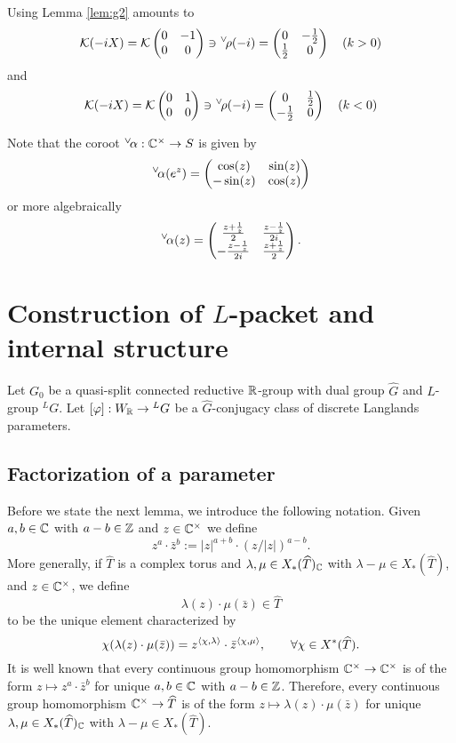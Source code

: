 \documentclass{article}
\theoremstyle{definition}
\numberwithin{equation}{section}
\renewcommand{\-}{\hyp{}}
\newcommand{\K}{\mathcal K}
\newcommand{\ch}[1]{\negthinspace\negthinspace\negthinspace\phantom{a}^\vee\negthinspace #1}
\begin{document}
Using Lemma \ref{lem:g2} amounts to 
$$
\K(-iX)=\K\begin{pmatrix}0&-1\\0&0
\end{pmatrix}\ni \ch\rho(-i)=
\begin{pmatrix}
  0&-\frac 12\\\frac 12&0
\end{pmatrix}\quad (k>0)
$$
and
$$
\K(-iX)=\K\begin{pmatrix}0&1\\0&0
\end{pmatrix}\ni \ch\rho(-i)=
\begin{pmatrix}
  0&\frac 12\\-\frac 12&0
\end{pmatrix}\quad (k<0)
$$

Note that the coroot $\ch\alpha:\C^\times \rightarrow S$ is given by
$$
\ch\alpha(e^z)=\begin{pmatrix}\cos(z)&\sin(z)\\-\sin(z)&\cos(z)
\end{pmatrix}
$$
or more algebraically
$$
\ch\alpha(z)=\begin{pmatrix}
\frac{z+\frac 1z}2&\frac{z-\frac 1z}{2i}\\
-\frac{z-\frac 1z}{2i}&\frac{z+\frac 1z}2
\end{pmatrix}.
$$


\section{Construction of $L$\-packet and internal structure} \label{sec:cons}

Let $G_0$ be a quasi-split connected reductive $\mathbb{R}$-group with dual group $\hat G$ and $L$\-group $^LG$.
Let $[\varphi] : W_{\mathbb{R}} \to {^LG}$ be a $\hat G$-conjugacy class of discrete Langlands parameters.

\subsection{Factorization of a parameter} \label{sub:fac}

Before we state the next lemma, we introduce the following notation. Given $a,b \in \mathbb{C}$ with $a-b \in \mathbb{Z}$ and $z \in \mathbb{C}^\times$ we define
\[ z^a \cdot \bar z^b := |z|^{a+b} \cdot (z/|z|)^{a-b}. \]
More generally, if $\hat T$ is a complex torus and $\lambda,\mu \in X_*(\widehat T)_{\mathbb{C}}$ with $\lambda-\mu \in X_*(\hat T)$, and $z \in \mathbb{C}^\times$, we define
\[ \lambda(z) \cdot \mu(\bar z) \in \hat T \]
to be the unique element characterized by 
\[ \chi(\lambda(z) \cdot \mu(\bar z)) = z^{\langle\chi,\lambda\rangle} \cdot \bar z^{\langle\chi,\mu\rangle},\qquad \forall \chi \in X^*(\widehat T).\]
It is well known that every continuous group homomorphism $\mathbb{C}^\times \to \mathbb{C}^\times$ is of the form $z \mapsto z^a \cdot \bar z^b$ for unique $a,b \in \mathbb{C}$ with $a-b \in \mathbb{Z}$. Therefore, every continuous group homomorphism $\mathbb{C}^\times \to \widehat T$ is of the form $z \mapsto \lambda(z) \cdot \mu(\bar z)$ for unique $\lambda,\mu \in X_*(\widehat T)_{\mathbb{C}}$ with $\lambda-\mu \in X_*(\hat T)$.
\end{document}
